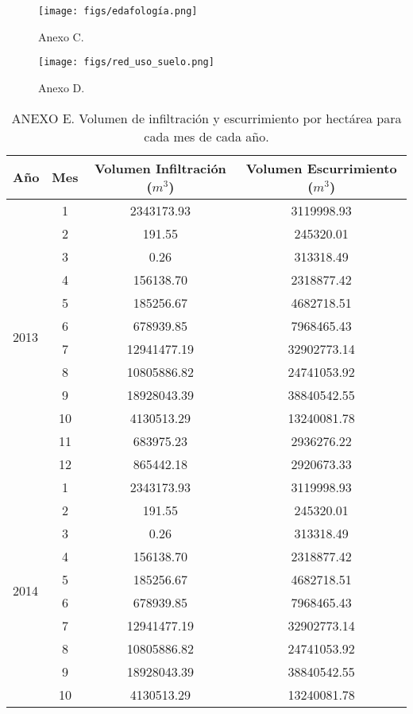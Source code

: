 \documentclass[12pt,letterpaper]{article}
\begin{document}
\newpage

\begin{figure}[H]
    \caption{Anexo C.}
    \label{anx:c}
    \centering
    \texttt{[image: figs/edafología.png]}
\end{figure}
\begin{figure}[H]
    \caption{Anexo D.}
    \label{anx:d}
    \centering
    \texttt{[image: figs/red\_uso\_suelo.png]}
\end{figure}

\newpage

\begin{table}[H]
\caption{ANEXO E. Volumen de infiltración y escurrimiento por hectárea para cada mes de cada año.}
\label{anx:e}
\centering
\begin{tabular}{l|c|c|c}
\hline
Año & Mes & Volumen Infiltración ($m^3$) & Volumen Escurrimiento ($m^3$) \\
\hline
\multirow[t]{12}{*}{2013} & 1 & 2343173.93 & 3119998.93 \\
 & 2 & 191.55 & 245320.01 \\
 & 3 & 0.26 & 313318.49 \\
 & 4 & 156138.70 & 2318877.42 \\
 & 5 & 185256.67 & 4682718.51 \\
 & 6 & 678939.85 & 7968465.43 \\
 & 7 & 12941477.19 & 32902773.14 \\
 & 8 & 10805886.82 & 24741053.92 \\
 & 9 & 18928043.39 & 38840542.55 \\
 & 10 & 4130513.29 & 13240081.78 \\
 & 11 & 683975.23 & 2936276.22 \\
 & 12 & 865442.18 & 2920673.33 \\
\cline{1-4}
\multirow[t]{12}{*}{2014} & 1 & 2343173.93 & 3119998.93 \\
 & 2 & 191.55 & 245320.01 \\
 & 3 & 0.26 & 313318.49 \\
 & 4 & 156138.70 & 2318877.42 \\
 & 5 & 185256.67 & 4682718.51 \\
 & 6 & 678939.85 & 7968465.43 \\
 & 7 & 12941477.19 & 32902773.14 \\
 & 8 & 10805886.82 & 24741053.92 \\
 & 9 & 18928043.39 & 38840542.55 \\
 & 10 & 4130513.29 & 13240081.78 \\

\end{tabular}
\end{table}
\end{document}
